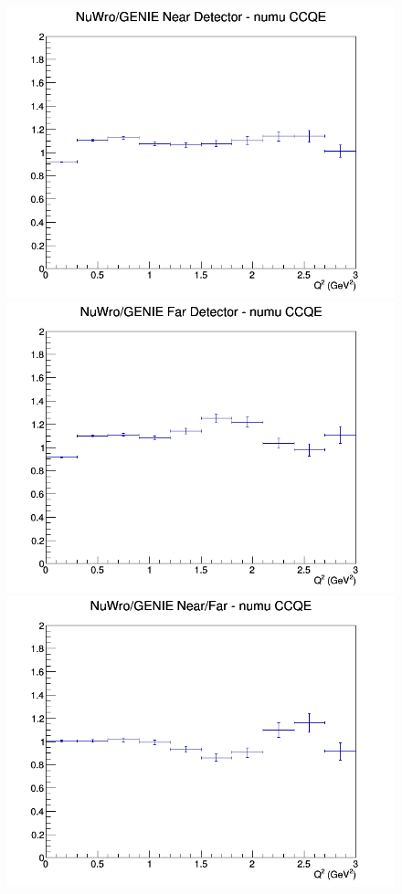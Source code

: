 \documentclass[12pt]{article}
\begin{document}
\begin{figure}[h]
\endminipage
\newline
{}
\includegraphics[width=\linewidth]{eff_Q2/LAr/ratios/CCQE_NuWro_GENIE_numu_near_Q2.png}
\endminipage
{}
\includegraphics[width=\linewidth]{eff_Q2/LAr/ratios/CCQE_NuWro_GENIE_numu_far_Q2.png}
\endminipage
{}
\includegraphics[width=\linewidth]{eff_Q2/LAr/ratios/CCQE_NuWro_GENIE_numu_NF_Q2.png}
\endminipage
\newline
\end{figure}
\clearpage
\end{document}
